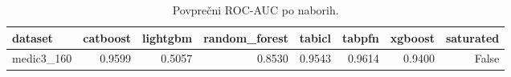 \begin{table}[htbp]
\centering
\caption{Povprečni ROC-AUC po naborih.}
\label{tab:pivot}
\begin{tabular}{lrrrrrrr}
\hline
dataset & catboost & lightgbm & random\_forest & tabicl & tabpfn & xgboost & saturated \\
\hline
medic3\_160 & 0.9599 & 0.5057 & 0.8530 & 0.9543 & 0.9614 & 0.9400 & False \\
\hline
\end{tabular}
\end{table}
